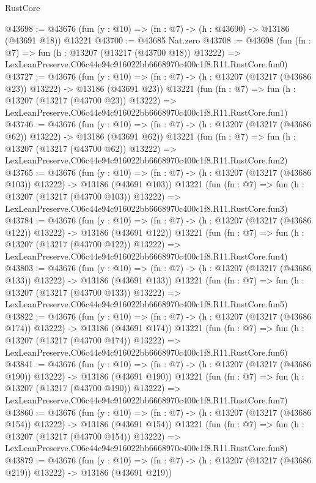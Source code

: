 \begin{lexlean}{RustCore}
\begin{coremodule}
@43698 := @43676 (fun (y : @10) => (fn : @7) -> (h : @43690) -> @13186 (@43691 @18)) @13221
@43700 := @43685 Nat.zero
@43708 := @43698
    (fun (fn : @7) =>
    fun (h : @13207 (@13217 (@43700 @18)) @13222) =>
    LexLeanPreserve.C06c44e94c916022bb6668970c400c1f8.R11.RustCore.fun0)
@43727 := @43676
    (fun (y : @10) => (fn : @7) -> (h : @13207 (@13217 (@43686 @23)) @13222) -> @13186 (@43691 @23))
    @13221
    (fun (fn : @7) =>
    fun (h : @13207 (@13217 (@43700 @23)) @13222) =>
    LexLeanPreserve.C06c44e94c916022bb6668970c400c1f8.R11.RustCore.fun1)
@43746 := @43676
    (fun (y : @10) => (fn : @7) -> (h : @13207 (@13217 (@43686 @62)) @13222) -> @13186 (@43691 @62))
    @13221
    (fun (fn : @7) =>
    fun (h : @13207 (@13217 (@43700 @62)) @13222) =>
    LexLeanPreserve.C06c44e94c916022bb6668970c400c1f8.R11.RustCore.fun2)
@43765 := @43676
    (fun (y : @10) =>
    (fn : @7) -> (h : @13207 (@13217 (@43686 @103)) @13222) -> @13186 (@43691 @103))
    @13221
    (fun (fn : @7) =>
    fun (h : @13207 (@13217 (@43700 @103)) @13222) =>
    LexLeanPreserve.C06c44e94c916022bb6668970c400c1f8.R11.RustCore.fun3)
@43784 := @43676
    (fun (y : @10) =>
    (fn : @7) -> (h : @13207 (@13217 (@43686 @122)) @13222) -> @13186 (@43691 @122))
    @13221
    (fun (fn : @7) =>
    fun (h : @13207 (@13217 (@43700 @122)) @13222) =>
    LexLeanPreserve.C06c44e94c916022bb6668970c400c1f8.R11.RustCore.fun4)
@43803 := @43676
    (fun (y : @10) =>
    (fn : @7) -> (h : @13207 (@13217 (@43686 @133)) @13222) -> @13186 (@43691 @133))
    @13221
    (fun (fn : @7) =>
    fun (h : @13207 (@13217 (@43700 @133)) @13222) =>
    LexLeanPreserve.C06c44e94c916022bb6668970c400c1f8.R11.RustCore.fun5)
@43822 := @43676
    (fun (y : @10) =>
    (fn : @7) -> (h : @13207 (@13217 (@43686 @174)) @13222) -> @13186 (@43691 @174))
    @13221
    (fun (fn : @7) =>
    fun (h : @13207 (@13217 (@43700 @174)) @13222) =>
    LexLeanPreserve.C06c44e94c916022bb6668970c400c1f8.R11.RustCore.fun6)
@43841 := @43676
    (fun (y : @10) =>
    (fn : @7) -> (h : @13207 (@13217 (@43686 @190)) @13222) -> @13186 (@43691 @190))
    @13221
    (fun (fn : @7) =>
    fun (h : @13207 (@13217 (@43700 @190)) @13222) =>
    LexLeanPreserve.C06c44e94c916022bb6668970c400c1f8.R11.RustCore.fun7)
@43860 := @43676
    (fun (y : @10) =>
    (fn : @7) -> (h : @13207 (@13217 (@43686 @154)) @13222) -> @13186 (@43691 @154))
    @13221
    (fun (fn : @7) =>
    fun (h : @13207 (@13217 (@43700 @154)) @13222) =>
    LexLeanPreserve.C06c44e94c916022bb6668970c400c1f8.R11.RustCore.fun8)
@43879 := @43676
    (fun (y : @10) =>
    (fn : @7) -> (h : @13207 (@13217 (@43686 @219)) @13222) -> @13186 (@43691 @219))

\end{coremodule}
\end{lexlean}
